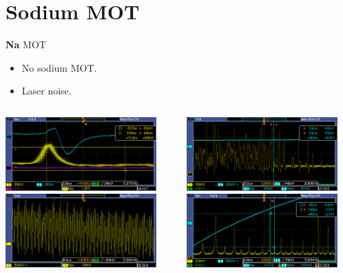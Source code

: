 \documentclass{beamer}
\begin{document}
\section{Sodium MOT}
\begin{frame}{\textbf{Na} MOT}
  \begin{itemize}
  \item<2->
    No sodium MOT.
  \item<3->
    Laser noise.
  \end{itemize}
  \begin{columns}
    \column{6cm}
    \begin{center}
       {
        \includegraphics[width=5.8cm]{srs_peak.png}
      }
       {
        \includegraphics[width=5.8cm]{srs_noise.png}
      }
    \end{center}
    \column{6cm}
    \begin{center}
       {
        \includegraphics[width=5.8cm]{FP_noise.png}
      }
       {
        \includegraphics[width=5.8cm]{FP_Cs.png}
      }
    \end{center}
  \end{columns}
\end{frame}

\begin{frame}{}
\end{frame}
\end{document}

